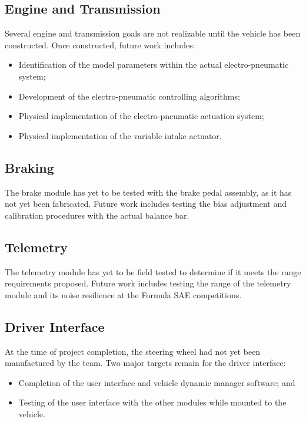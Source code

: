 \subsection{Engine and Transmission}

Several engine and transmission goals are not realizable until the vehicle has been constructed. Once constructed, future work includes:

\begin{itemize}
  \item Identification of the model parameters within the actual electro-pneumatic system;
  \item Development of the electro-pneumatic controlling algorithms;
  \item Physical implementation of the electro-pneumatic actuation system;
  \item Physical implementation of the variable intake actuator.
\end{itemize}

\subsection{Braking}

The brake module has yet to be tested with the brake pedal assembly, as it has not yet been fabricated. Future work includes testing the bias adjustment and calibration procedures with the actual balance bar.

\subsection{Telemetry}

The telemetry module has yet to be field tested to determine if it meets the range requirements proposed. Future work includes testing the range of the telemetry module and its noise resilience at the Formula SAE competitions.

\subsection{Driver Interface}

At the time of project completion, the steering wheel had not yet been manufactured by the team. Two major targets remain for the driver interface:

\begin{itemize}
	\item Completion of the user interface and vehicle dynamic manager software; and
	\item Testing of the user interface with the other modules while mounted to the vehicle.
\end{itemize}
